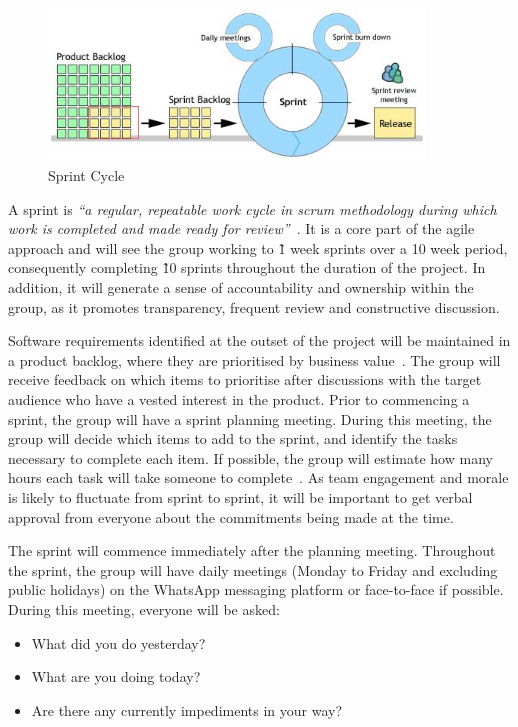 \begin{figure}
  \centering
  \begin{minipage}{10cm}
    \centering
    \includegraphics[width=10cm]{inc/sprint_cycle.jpg}
    \caption{Sprint Cycle}
    \label{fig:spint_cycle}
  \end{minipage}
\end{figure}

A sprint is \emph{``a regular, repeatable work cycle in scrum methodology during which work is completed and made ready for review''}~\parencite{web:scrum_sprint}. It is a core part of the agile approach and will see the group working to \~1 week sprints over a 10 week period, consequently completing \~10 sprints throughout the duration of the project. In addition, it will generate a sense of accountability and ownership within the group, as it promotes transparency, frequent review and constructive discussion.

Software requirements identified at the outset of the project will be maintained in a product backlog, where they are prioritised by business value~\parencite{book:agile_excellence}. The group will receive feedback on which items to prioritise after discussions with the target audience who have a vested interest in the product. Prior to commencing a sprint, the group will have a sprint planning meeting. During this meeting, the group will decide which items to add to the sprint, and identify the tasks necessary to complete each item. If possible, the group will estimate how many hours each task will take someone to complete~\parencite{web:scrum_sprint}. As team engagement and morale is likely to fluctuate from sprint to sprint, it will be important to get verbal approval from everyone about the commitments being made at the time.

The sprint will commence immediately after the planning meeting. Throughout the sprint, the group will have daily meetings (Monday to Friday and excluding public holidays) on the WhatsApp messaging platform or face-to-face if possible. During this meeting, everyone will be asked:

\begin{itemize}
  \item What did you do yesterday?
  \item What are you doing today?
  \item Are there any currently impediments in your way?
\end{itemize}

